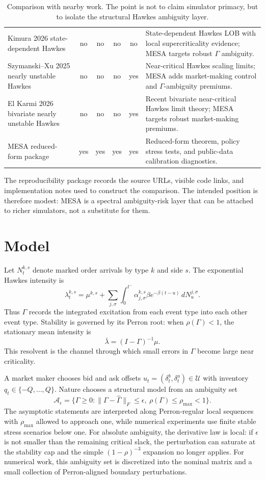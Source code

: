 \documentclass[11pt]{article}
\newcommand{\cA}{\mathcal{A}}
\newcommand{\cU}{\mathcal{U}}
\newcommand{\Gammahat}{\widehat{\Gamma}}
\begin{document}
\begin{table}[!htbp]
{\begin{tabular}{@{}>{\raggedright\arraybackslash}p{5.0cm}cccc>{\raggedright\arraybackslash}p{5.8cm}@{}}
Kimura 2026 state-dependent Hawkes & no & no & no & no & State-dependent Hawkes LOB with local supercriticality evidence; MESA targets robust $\Gamma$ ambiguity. \\
Szymanski--Xu 2025 nearly unstable Hawkes & no & no & no & yes & Near-critical Hawkes scaling limits; MESA adds market-making control and $\Gamma$-ambiguity premiums. \\
El Karmi 2026 bivariate nearly unstable Hawkes & no & no & no & yes & Recent bivariate near-critical Hawkes limit theory; MESA targets robust market-making premiums. \\
MESA reduced-form package & yes & yes & yes & yes & Reduced-form theorem, policy stress tests, and public-data calibration diagnostics. \\
\bottomrule
\end{tabular}}
\caption{Comparison with nearby work. The point is not to claim simulator
primacy, but to isolate the structural Hawkes ambiguity layer.}
\label{tab:sota}
\end{table}

The reproducibility package records the source URLs, visible code links, and
implementation notes used to construct the comparison. The intended position is
therefore modest: MESA is a spectral ambiguity-risk layer that can be attached
to richer simulators, not a substitute for them.

\FloatBarrier
\section{Model}

Let $N^{k,s}_t$ denote marked order arrivals by type $k$ and side $s$. The
exponential Hawkes intensity is
\[
\lambda^{k,s}_t = \mu^{k,s} +
\sum_{j,\sigma}\int_0^{t^-}
\alpha^{k,s}_{j,\sigma}\beta e^{-\beta(t-u)}\,dN^{j,\sigma}_u.
\]
Thus $\Gamma$ records the integrated excitation from each event type into each
other event type. Stability is governed by its Perron root: when
$\rho(\Gamma)<1$, the stationary mean intensity is
\[
\bar\lambda = (I-\Gamma)^{-1}\mu.
\]
This resolvent is the channel through which small errors in $\Gamma$ become
large near criticality.

A market maker chooses bid and ask offsets
$u_t=(\delta^b_t,\delta^a_t)\in\cU$ with inventory $q_t\in\{-Q,\ldots,Q\}$.
Nature chooses a structural model from an ambiguity set
\[
\cA_\epsilon = \{\Gamma\ge 0:
\|\Gamma-\Gammahat\|_F\le \epsilon,\ \rho(\Gamma)\le \rho_{\max}<1\}.
\]
The asymptotic statements are interpreted along Perron-regular local sequences
with $\rho_{\max}$ allowed to approach one, while numerical experiments use
finite stable stress scenarios below one. For absolute ambiguity, the derivative
law is local: if $\epsilon$ is not smaller than the remaining critical slack,
the perturbation can saturate at the stability cap and the simple
$(1-\rho)^{-3}$ expansion no longer applies.
For numerical work, this ambiguity set is discretized into the nominal matrix
and a small collection of Perron-aligned boundary perturbations.
\end{document}
